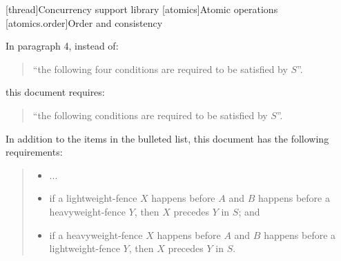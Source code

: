 

\setcounter{chapter}{32}
[thread]{Concurrency support library}
\setcounter{section}{4}
[atomics]{Atomic operations}
\setcounter{subsection}{3}
[atomics.order]{Order and consistency}

In  paragraph 4, instead of:

\begin{quote}
``the following four conditions are required to be satisfied by $S$''.
\end{quote}

this document requires:

\begin{quote}
``the following conditions are required to be satisfied by $S$''.
\end{quote}

In addition to the items in the bulleted list, this document has the
following requirements:
\begin{quote}
\begin{itemize}
\item
  ...
\item
if a  lightweight-fence $X$ happens before $A$ and $B$ happens
before a  heavyweight-fence $Y$, then $X$ precedes $Y$ in $S$; and
\item  if a  heavyweight-fence $X$ happens before $A$ and $B$ happens
before a  lightweight-fence $Y$, then $X$ precedes $Y$ in $S$.
\end{itemize}
\end{quote}
